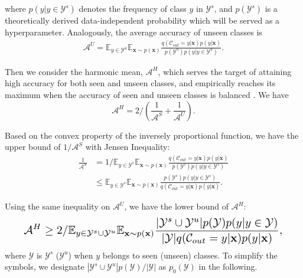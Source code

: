 \documentclass{article}
\begin{document}
	where $p(y|y\in \mathcal{Y}^s)$ denotes the frequency of class $y$ in $\mathcal{Y}^s$, and $p(\mathcal{Y}^s)$ is a theoretically derived data-independent probability which will be served as a hyperparameter. Analogously, the average accuracy of unseen classes is
    \vspace{-0.2ex}
	\begin{equation}
	\begin{aligned}
\mathcal{A}^U= \mathbb{E}_{y\in \mathcal{Y}^u}\mathbb{E}_{\mathbf{x}\sim p(\mathbf{x})}\frac{ q(\mathcal{C}_{out}=y|\mathbf{x})p(y|\mathbf{x})}{p(\mathcal{Y}^u)p(y|y\in \mathcal{Y}^u)}.
	\end{aligned}
    \label{eq5}
	\end{equation}
    
Then we consider the harmonic mean, $\mathcal{A}^H$, which serves the target of attaining high accuracy for both seen and unseen classes, and empirically reaches its maximum when the accuracy of seen and unseen classes is balanced \cite{xian2017zero}. We have
\vspace{-1.7ex}
	\begin{equation}
\displaystyle
	\mathcal{A}^H=2/(\frac{1}{\mathcal{A}^S}+\frac{1}{\mathcal{A}^U}).
\label{eq6}
	\end{equation}
    
	Based on the convex property of the inversely proportional function, we have the upper bound of $1/{\mathcal{A}^S}$ with Jensen Inequality:
    \vspace{-0.5ex}
	\begin{equation}
	\begin{aligned}
\displaystyle
	\frac{1}{\mathcal{A}^S}&=1/\mathbb{E}_{y\in \mathcal{Y}^s}\mathbb{E}_{\mathbf{x}\sim p(\mathbf{x})}\frac{ q(\mathcal{C}_{out}=y|\mathbf{x})p(y|\mathbf{x})}{p(\mathcal{Y}^s)p(y|y\in \mathcal{Y}^s)}\\
	&\leq \mathbb{E}_{y\in \mathcal{Y}^s}\mathbb{E}_{\mathbf{x}\sim p(\mathbf{x})}\frac{p(\mathcal{Y}^s)p(y|y\in \mathcal{Y}^s)}{q(\mathcal{C}_{out}=y|\mathbf{x})p(y|\mathbf{x})}.
\end{aligned}
    \label{eq7}
	\end{equation}
    
	Using the same inequality on $\mathcal{A}^U$, we have the lower bound of $\mathcal{A}^H$:
    \vspace{-1.ex}
	\begin{equation}
	 \resizebox{0.91\linewidth}{!}{$
	\displaystyle
	\mathcal{A}^H\ge 2/\mathbb{E}_{y\in \mathcal{Y}^s\cup\mathcal{Y}^u}\mathbb{E}_{\mathbf{x}\sim p(\mathbf{x})}\frac{|\mathcal{Y}^s\cup\mathcal{Y}^u|p(\mathcal{Y})p(y|y\in \mathcal{Y})}{|\mathcal{Y}|q(\mathcal{C}_{out}=y|\mathbf{x})p(y|\mathbf{x})},
	  $}
    \label{eq8}
	\end{equation}
    where $\mathcal{Y}$ is $\mathcal{Y}^s$ ($\mathcal{Y}^u$) when $y$ belongs to seen (unseen) classes. To simplify the symbols, we designate $|\mathcal{Y}^s\cup\mathcal{Y}^u|p(\mathcal{Y})/|\mathcal{Y}|$ as $p_0(\mathcal{Y})$ in the following.
    
\end{document}
